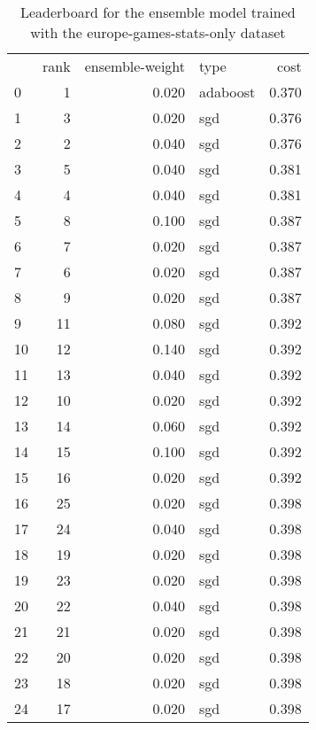 \begin{table}[]
	\centering
	\begin{tabular}{lrrlr}
		   & rank & ensemble-weight & type     & cost  \\
		0  & 1    & 0.020           & adaboost & 0.370 \\
		1  & 3    & 0.020           & sgd      & 0.376 \\
		2  & 2    & 0.040           & sgd      & 0.376 \\
		3  & 5    & 0.040           & sgd      & 0.381 \\
		4  & 4    & 0.040           & sgd      & 0.381 \\
		5  & 8    & 0.100           & sgd      & 0.387 \\
		6  & 7    & 0.020           & sgd      & 0.387 \\
		7  & 6    & 0.020           & sgd      & 0.387 \\
		8  & 9    & 0.020           & sgd      & 0.387 \\
		9  & 11   & 0.080           & sgd      & 0.392 \\
		10 & 12   & 0.140           & sgd      & 0.392 \\
		11 & 13   & 0.040           & sgd      & 0.392 \\
		12 & 10   & 0.020           & sgd      & 0.392 \\
		13 & 14   & 0.060           & sgd      & 0.392 \\
		14 & 15   & 0.100           & sgd      & 0.392 \\
		15 & 16   & 0.020           & sgd      & 0.392 \\
		16 & 25   & 0.020           & sgd      & 0.398 \\
		17 & 24   & 0.040           & sgd      & 0.398 \\
		18 & 19   & 0.020           & sgd      & 0.398 \\
		19 & 23   & 0.020           & sgd      & 0.398 \\
		20 & 22   & 0.040           & sgd      & 0.398 \\
		21 & 21   & 0.020           & sgd      & 0.398 \\
		22 & 20   & 0.020           & sgd      & 0.398 \\
		23 & 18   & 0.020           & sgd      & 0.398 \\
		24 & 17   & 0.020           & sgd      & 0.398 \\
	\end{tabular}

	\caption{Leaderboard for the ensemble model trained with the europe-games-stats-only dataset}
	\label{tab:lb-europe-games-stats-only-randsplit}
\end{table}

